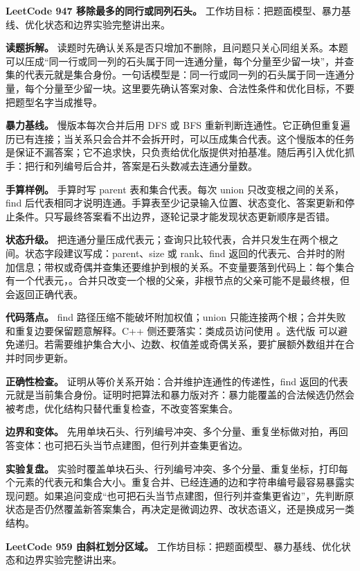 \noindent\textbf{LeetCode 947 移除最多的同行或同列石头。} 工作坊目标：把题面模型、暴力基线、优化状态和边界实验完整讲出来。

\textbf{读题拆解。} 读题时先确认关系是否只增加不删除，且问题只关心同组关系。本题可以压成“同一行或同一列的石头属于同一连通分量，每个分量至少留一块”，并查集的代表元就是集合身份。一句话模型是：同一行或同一列的石头属于同一连通分量，每个分量至少留一块。这里要先确认答案对象、合法性条件和优化目标，不要把题型名字当成推导。

\textbf{暴力基线。} 慢版本每次合并后用 DFS 或 BFS 重新判断连通性。它正确但重复遍历已有连接；当关系只会合并不会拆开时，可以压成集合代表。这个慢版本的任务是保证不漏答案；它不追求快，只负责给优化版提供对拍基准。随后再引入优化抓手：把行和列编号后合并，答案是石头数减去连通分量数。

\textbf{手算样例。} 手算时写 parent 表和集合代表。每次 union 只改变根之间的关系，find 后代表相同才说明连通。手算表至少记录输入位置、状态变化、答案更新和停止条件。只写最终答案看不出边界，逐轮记录才能发现状态更新顺序是否错。

\textbf{状态升级。} 把连通分量压成代表元；查询只比较代表，合并只发生在两个根之间。状态字段建议写成：parent、size 或 rank、find 返回的代表元、合并时的附加信息；带权或奇偶并查集还要维护到根的关系。不变量要落到代码上：每个集合有一个代表元，。合并只改变一个根的父亲，非根节点的父亲可能不是最终根，但  会返回正确代表。

\textbf{代码落点。} find 路径压缩不能破坏附加权值；union 只能连接两个根；合并失败和重复边要保留题意解释。C++ 侧还要落实：类成员访问使用 。迭代版  可以避免递归。若需要维护集合大小、边数、权值差或奇偶关系，要扩展额外数组并在合并时同步更新。

\textbf{正确性检查。} 证明从等价关系开始：合并维护连通性的传递性，find 返回的代表元就是当前集合身份。证明时把算法和暴力版对齐：暴力能覆盖的合法候选仍然会被考虑，优化结构只替代重复检查，不改变答案集合。

\textbf{边界和变体。} 先用单块石头、行列编号冲突、多个分量、重复坐标做对拍，再回答变体：也可把石头当节点建图，但行列并查集更省边。

\textbf{实验复盘。} 实验时覆盖单块石头、行列编号冲突、多个分量、重复坐标，打印每个元素的代表元和集合大小。重复合并、已经连通的边和字符串编号最容易暴露实现问题。如果追问变成“也可把石头当节点建图，但行列并查集更省边”，先判断原状态是否仍然覆盖新答案集合，再决定是微调边界、改状态语义，还是换成另一类结构。

\noindent\textbf{LeetCode 959 由斜杠划分区域。} 工作坊目标：把题面模型、暴力基线、优化状态和边界实验完整讲出来。

